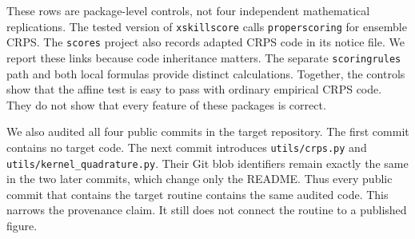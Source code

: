 \documentclass[11pt]{article}
\begin{document}
\begin{table}[htbp]
\centering
\caption{Affine metamorphic negative controls. Each row uses 4,000 forecast cases and five recodings per case. The tolerance is $10^{-8}$ in the original units.}
\label{tab:crosslibrary}
\small
{}
\end{table}

These rows are package-level controls, not four independent mathematical replications. The tested version of \texttt{xskillscore} calls \texttt{properscoring} for ensemble CRPS. The \texttt{scores} project also records adapted CRPS code in its notice file. We report these links because code inheritance matters. The separate \texttt{scoringrules} path and both local formulas provide distinct calculations. Together, the controls show that the affine test is easy to pass with ordinary empirical CRPS code. They do not show that every feature of these packages is correct.

We also audited all four public commits in the target repository. The first commit contains no target code. The next commit introduces \texttt{utils/crps.py} and \texttt{utils/kernel\_quadrature.py}. Their Git blob identifiers remain exactly the same in the two later commits, which change only the README. Thus every public commit that contains the target routine contains the same audited code. This narrows the provenance claim. It still does not connect the routine to a published figure.
\end{document}
